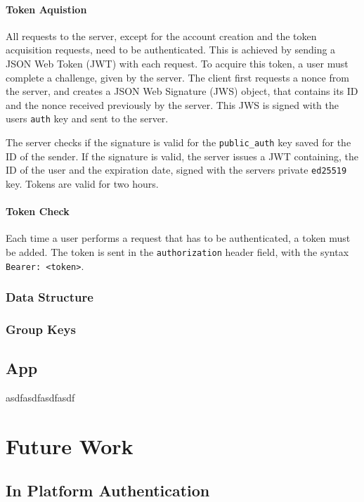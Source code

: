 \documentclass[a4paper, oneside]{discothesis}
\begin{document}
\subsubsection{Token Aquistion}

All requests to the server, except for the account creation and the token acquisition requests, need to be authenticated. This is achieved by sending a JSON Web Token (JWT) with each request. To acquire this token, a user must complete a challenge, given by the server. The client first requests a nonce from the server, and creates a JSON Web Signature (JWS) object, that contains its ID and the nonce received previously by the server. This JWS is signed with the users \texttt{auth} key and sent to the server.

The server checks if the signature is valid for the \texttt{public\_auth} key saved for the ID of the sender. If the signature is valid, the server issues a JWT containing, the ID of the user and the expiration date, signed with the servers private \texttt{ed25519} key. Tokens are valid for two hours.

\subsubsection{Token Check}

Each time a user performs a request that has to be authenticated, a token must be added. The token is sent in the \texttt{authorization} header field, with the syntax \texttt{Bearer: <token>}.

\subsection{Data Structure}

\subsection{Group Keys}

\section{App}
asdfasdfasdfasdf
\chapter{Future Work}
\label{sec:future_work}

\section{In Platform Authentication}
\end{document}
